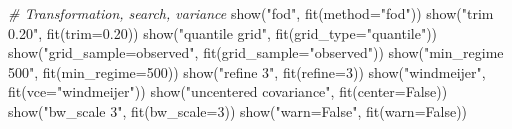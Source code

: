 \documentclass[
  10.5pt,
  a4paper,
]{article}
\newenvironment{Shaded}{}{}
\newcommand{\CommentTok}[1]{\textcolor[rgb]{0.38,0.63,0.69}{\textit{#1}}}
\newcommand{\DecValTok}[1]{\textcolor[rgb]{0.25,0.63,0.44}{#1}}
\newcommand{\FloatTok}[1]{\textcolor[rgb]{0.25,0.63,0.44}{#1}}
\newcommand{\NormalTok}[1]{#1}
\newcommand{\OperatorTok}[1]{\textcolor[rgb]{0.40,0.40,0.40}{#1}}
\newcommand{\StringTok}[1]{\textcolor[rgb]{0.25,0.44,0.63}{#1}}
\newcommand{\VariableTok}[1]{\textcolor[rgb]{0.10,0.09,0.49}{#1}}
\begin{document}
\begin{Shaded}
\begin{Highlighting}[]
\CommentTok{\# Transformation, search, variance}
\NormalTok{show(}\StringTok{"fod"}\NormalTok{, fit(method}\OperatorTok{=}\StringTok{"fod"}\NormalTok{))}
\NormalTok{show(}\StringTok{"trim 0.20"}\NormalTok{, fit(trim}\OperatorTok{=}\FloatTok{0.20}\NormalTok{))}
\NormalTok{show(}\StringTok{"quantile grid"}\NormalTok{, fit(grid\_type}\OperatorTok{=}\StringTok{"quantile"}\NormalTok{))}
\NormalTok{show(}\StringTok{"grid\_sample=\textquotesingle{}observed\textquotesingle{}"}\NormalTok{, fit(grid\_sample}\OperatorTok{=}\StringTok{"observed"}\NormalTok{))}
\NormalTok{show(}\StringTok{"min\_regime 500"}\NormalTok{, fit(min\_regime}\OperatorTok{=}\DecValTok{500}\NormalTok{))}
\NormalTok{show(}\StringTok{"refine 3"}\NormalTok{, fit(refine}\OperatorTok{=}\DecValTok{3}\NormalTok{))}
\NormalTok{show(}\StringTok{"windmeijer"}\NormalTok{, fit(vce}\OperatorTok{=}\StringTok{"windmeijer"}\NormalTok{))}
\NormalTok{show(}\StringTok{"uncentered covariance"}\NormalTok{, fit(center}\OperatorTok{=}\VariableTok{False}\NormalTok{))}
\NormalTok{show(}\StringTok{"bw\_scale 3"}\NormalTok{, fit(bw\_scale}\OperatorTok{=}\DecValTok{3}\NormalTok{))}
\NormalTok{show(}\StringTok{"warn=False"}\NormalTok{, fit(warn}\OperatorTok{=}\VariableTok{False}\NormalTok{))}
\end{Highlighting}
\end{Shaded}
\end{document}
